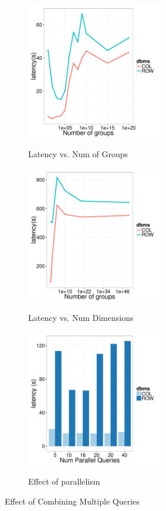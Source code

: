 \begin{figure}[t]
	\centering
	\begin{subfigure}{0.33\linewidth}
		\centering
		{\includegraphics[width=6cm] {Images/multi_gb_same.pdf}}
		\caption{Latency vs. Num of Groups}
		\label{fig:multi_gb_same}
	\end{subfigure}
	\begin{subfigure}{0.33\linewidth}
		\centering
		{\includegraphics[width=6cm] {Images/multi_gb.pdf}}
		\caption{Latency vs. Num Dimensions}
		\label{fig:multi_gb_bp}
	\end{subfigure}
	\begin{subfigure}{0.33\linewidth}
		\centering
		{\includegraphics[width=6cm] {Images/parallel_noop.pdf}}
		\caption{Effect of parallelism}
		\label{fig:parallelism}
	\end{subfigure}
	\caption{Effect of Combining Multiple Queries }
	\label{fig:bank_perf}
\end{figure}

